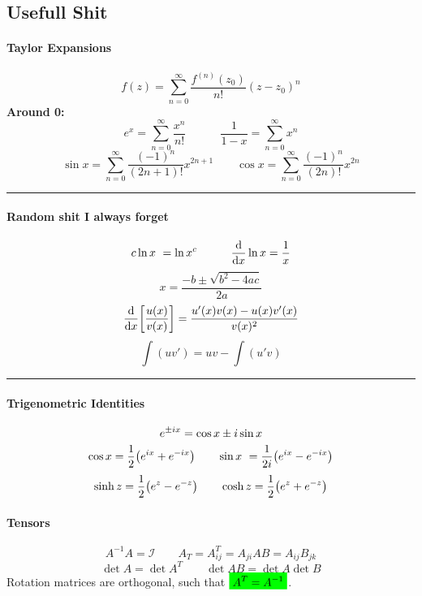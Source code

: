 \documentclass[10pt,a4paper]{article}
\renewcommand{\exp}{e^}
\newcommand{\zeroinfsum}{\sum_{n=0}^{\infty}}
\newcommand{\holine}[1][\medskipamount]{\par\vspace*{\dimexpr-\parskip-\baselineskip+#1}\noindent\rule{\linewidth}{1pt}\par\vspace*{\dimexpr-\parskip-.5\baselineskip+#1}}
\newcommand{\half}{\frac{1}{2}}
\newcommand{\gr}[1]{\colorbox{green}{$\displaystyle #1$}}
\begin{document}
\begin{multicols}{2}


\part*{Usefull Shit}

\subsection*{Taylor Expansions}
\[
    f(z) = \zeroinfsum \frac{f^{(n)}(z_0)}{n!}(z-z_0)^n
\]
\textbf{Around 0:}
\[
    \exp{x} = \sum_{n=0}^\infty \dfrac{x^n}{n!} \quad\quad\quad
    \frac{1}{1-x} = \sum_{n=0}^\infty x^n
\]
\[
    \sin{x} = \sum_{n=0}^\infty \dfrac{(-1)^n}{(2n+1)!}x^{2n+1} \quad\quad
    \cos{x} = \sum_{n=0}^\infty \dfrac{(-1)^n}{(2n)!}x^{2n}
\]


\holine
\subsection*{Random shit I always forget}
\[
    c \ln{x} = \ln{x^c} \quad\quad\quad \dv{x}\ln{x} = \frac{1}{x}
\]
\[
    x = \frac{-b\pm \sqrt{b^2 - 4ac}}{2a}
\]
\[
    \dv{x}\qty[\dfrac{u(x)}{v(x)}] = \dfrac{u'(x)v(x) - u(x)v'(x)}{v(x)^2}
\]
\[
    \int (uv') = uv - \int(u'v)
\]


\holine
\subsection*{Trigenometric Identities}
\[
    \exp{\pm i x} = \cos{x} \pm i\sin{x} \\
\]
\[
    \cos{x} = \half \qty(\exp{ix} + \exp{-ix}) \quad\quad
    \sin{x} = \frac{1}{2i}\qty(\exp{ix} - \exp{-ix})
\]
\[
    \sinh{z} = \half\qty(\exp{z}-\exp{-z}) \quad\quad \cosh{z} = \half\qty(\exp{z}+\exp{-z})
\]




\subsection*{Tensors}
\[
    A^{-1}A = \mathcal{I} \quad\quad A_T = A_{ij}^T = A_{ji}
    AB = A_{ij}B_{jk}
\]
\[
    \det{A} = \det{A^T} \quad\quad \det{AB} = \det{A}\det{B}
\]
Rotation matrices are orthogonal, such that $\gr{A^T = A^{-1}}$.


\end{multicols}
\end{document}
